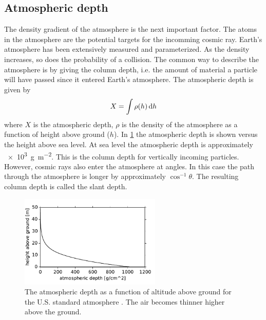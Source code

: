 \subsection{Atmospheric depth}


The density gradient of the atmosphere is the next important factor. The atoms in the atmosphere are the potential targets for the incomming cosmic ray. Earth's atmosphere has been extensively measured and parameterized. As the density increases, so does the probability of a collision. The common way to describe the atmosphere is by giving the column depth, i.e. the amount of material a particle will have passed since it entered Earth's atmosphere. The atmospheric depth is given by
%
\begin{equation}
    X = \int \rho(h) \mathop{}\!\mathrm{d} h
\end{equation}
%
where $X$ is the atmospheric depth, $\rho$ is the density of the atmosphere as a function of height above ground ($h$). In \cref{fig:atmospheric_depth} the atmospheric depth is shown versus the height above sea level. At sea level the atmospheric depth is approximately \SI{e3}{\gram\per\meter\squared}. This is the column depth for vertically incoming particles. However, cosmic rays also enter the atmosphere at angles. In this case the path through the atmosphere is longer by approximately $\cos^{-1} \theta$. The resulting column depth is called the slant depth.

\begin{figure}
    \centering
    \includegraphics[width=0.6\textwidth]
                    {plots/cosmic-rays/atmospheric_depth}
    \caption{The atmospheric depth as a function of altitude above ground for the U.S. standard atmosphere \cite{heck2013corsika}. The air becomes thinner higher above the ground.}
    \label{fig:atmospheric_depth}
\end{figure}

